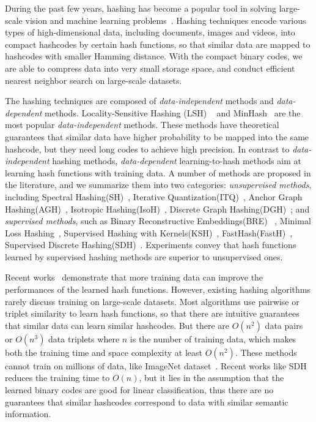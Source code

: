\documentclass[conference]{IEEEtran}
\begin{document}
During the past few years, hashing has become a popular tool in solving large-scale vision and machine learning problems~\cite{li2011hashing,liu2012supervised,li2013sign}. Hashing techniques encode various types of high-dimensional data, including documents, images and videos, into compact hashcodes by certain hash functions, so that similar data are mapped to hashcodes with smaller Hamming distance. With the compact binary codes, we are able to compress data into very small storage space, and conduct efficient nearest neighbor search on large-scale datasets.

The hashing techniques are composed of {\em data-independent} methods and {\em data-dependent} methods. Locality-Sensitive Hashing (LSH) ~\cite{datar2004locality,gionis1999similarity} and MinHash~\cite{broder1998min} are the most popular {\em data-independent} methods. These methods have theoretical guarantees that similar data have higher probability to be mapped into the same hashcode, but they need long codes to achieve high precision. In contrast to {\em data-independent} hashing methods, {\em data-dependent} learning-to-hash methods aim at learning hash functions with training data. A number of methods are proposed in the literature, and we summarize them into two categories: {\em unsupervised methods}, including Spectral Hashing(SH)~\cite{weiss2009spectral}, Iterative Quantization(ITQ)~\cite{gong2013iterative}, Anchor Graph Hashing(AGH)~\cite{liu2011hashing}, Isotropic Hashing(IsoH)~\cite{kong2012isotropic}, Discrete Graph Hashing(DGH)~\cite{liu2014discrete}; and {\em supervised methods}, such as Binary Reconstructive Embeddings(BRE) ~\cite{kulis2009learning}, Minimal Loss Hashing~\cite{norouzi2011minimal}, Supervised Hashing with Kernels(KSH)~\cite{liu2012supervised}, FastHash(FastH)~\cite{lin2014fast}, Supervised Discrete Hashing(SDH)~\cite{Shen_2015_CVPR}. Experiments convey that hash functions learned by supervised hashing methods are superior to unsupervised ones.

Recent works~\cite{Shen_2015_CVPR,lin2014fast} demonstrate that more training data can improve the performances of the learned hash functions. However, existing hashing algorithms rarely discuss training on large-scale datasets. Most algorithms use pairwise or triplet similarity to learn hash functions, so that there are intuitive guarantees that similar data can learn similar hashcodes. But there are $O(n^2)$ data pairs or $O(n^3)$ data triplets where $n$ is the number of training data, which makes both the training time and space complexity at least $O(n^2)$. These methods cannot train on millions of data, like ImageNet dataset~\cite{deng2009imagenet}. Recent works like SDH~\cite{Shen_2015_CVPR} reduces the training time to $O(n)$, but it lies in the assumption that the learned binary codes are good for linear classification, thus there are no guarantees that similar hashcodes correspond to data with similar semantic information.
\end{document}
